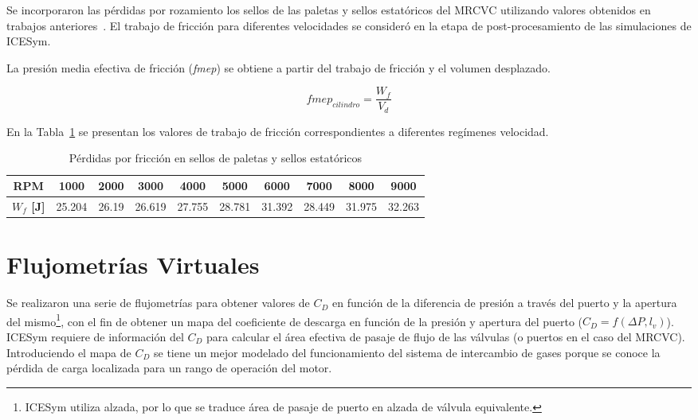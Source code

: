 Se incorporaron las pérdidas por rozamiento los sellos de las paletas y sellos
estatóricos del MRCVC utilizando valores obtenidos en trabajos
anteriores~\parencite{roldan20}.
%
El trabajo de fricción para diferentes velocidades se consideró en la etapa de
post-procesamiento de las simulaciones de ICESym.

La presión media efectiva de fricción (\textit{fmep}) se obtiene a partir del
trabajo de fricción y el volumen desplazado.

\begin{equation}
  fmep_{cilindro} = \frac{W_{f}}{V_{d}}
\end{equation}

En la Tabla~\ref{tab:trabajo_fricción} se presentan los valores de trabajo de
fricción correspondientes a diferentes regímenes velocidad.

\begin{table}[h!]
  \centering
  \begin{tabular}{cccccccccc}
    \toprule
    \textbf{RPM} & 1000 & 2000 & 3000 & 4000 & 5000 & 6000 & 7000 & 8000 & 9000 \\
    \midrule
    \textbf{$W_{f}$ [J]} & 25.204 & 26.19 & 26.619 & 27.755 & 28.781 & 31.392 & 28.449 & 31.975 & 32.263 \\
    \bottomrule
  \end{tabular}
  \caption{Pérdidas por fricción en sellos de paletas y sellos estatóricos}\label{tab:trabajo_fricción}
\end{table}



\section{Flujometrías Virtuales}
%
Se realizaron una serie de flujometrías para obtener valores de $C_{D}$ en
función de la diferencia de presión a través del puerto y la apertura del
mismo\footnote{ICESym utiliza alzada, por lo que se traduce área de pasaje de
puerto en alzada de válvula equivalente.}, con el fin de obtener un mapa del
coeficiente de descarga en función de la presión y apertura del puerto
($C_{D} = f(\Delta P,l_v)$).
%
ICESym requiere de información del $C_{D}$ para calcular el área efectiva
de pasaje de flujo de las válvulas (o puertos en el caso del MRCVC).
%
Introduciendo el mapa de $C_{D}$ se tiene un mejor modelado del funcionamiento
del sistema de intercambio de gases porque se conoce la pérdida de carga
localizada para un rango de operación del motor.

